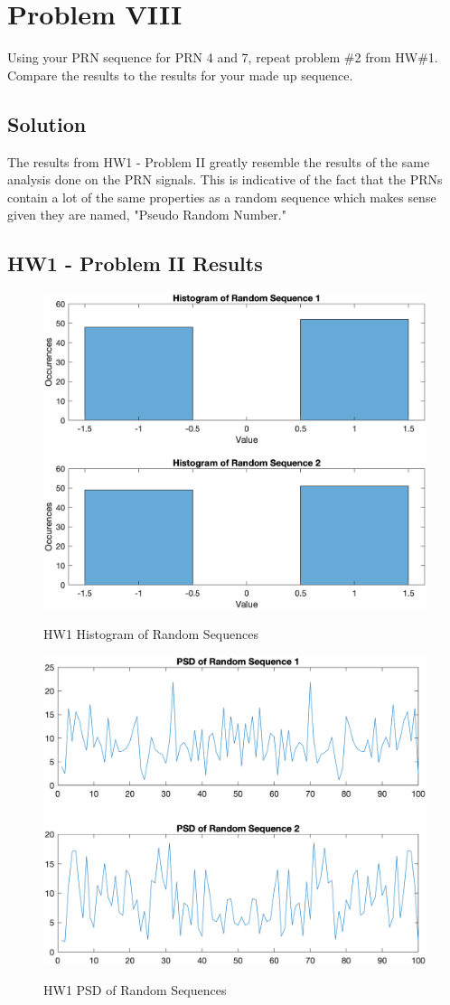 \documentclass{article}
\begin{document}
\section*{Problem VIII}
Using your PRN sequence for PRN 4 and 7, repeat problem \#2 from HW\#1. Compare the
results to the results for your made up sequence.

\subsection*{Solution}
The results from HW1 - Problem II greatly resemble the results of the same analysis done on the PRN signals.  This is indicative of the fact that the PRNs contain a lot of the same properties as a random sequence which makes sense given they are named, "Pseudo Random Number."
\subsection*{HW1 - Problem II Results}
\begin{figure}[H]
    \centering
    \includegraphics[width=0.75\linewidth]{../figures/p8_hw1_2a.png}\label{fig:p8_hw1_2a}
    \caption{HW1 Histogram of Random Sequences}
\end{figure}
\begin{figure}[H]
    \centering
    \includegraphics[width=0.75\linewidth]{../figures/p8_hw1_2b.png}\label{fig:p8_hw1_2b}
    \caption{HW1 PSD of Random Sequences}
\end{figure}
\end{document}
